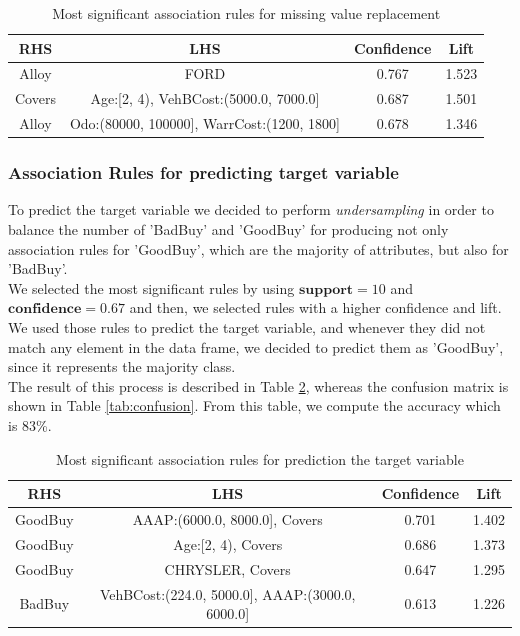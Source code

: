 \documentclass{article}
\begin{document}
	
	\begin{table}[H]
		\centering
		\begin{tabular}{|cc|cc|}
			\hline
			\textbf{RHS} & \textbf{LHS} & \textbf{Confidence} & \textbf{Lift} \\
			\hline
			\rowcolor{Gray}
			Alloy & FORD  & 0.767 & 1.523\\
			Covers & Age:[2, 4), VehBCost:(5000.0, 7000.0]  & 0.687 & 1.501 \\
			\rowcolor{Gray}
			Alloy &  Odo:(80000, 100000], WarrCost:(1200, 1800] &  0.678 & 1.346 \\
			\hline
		\end{tabular}
		\caption{Most significant association rules for missing value replacement}
		\label{tab:missingvalrules}
	\end{table}
	
	
	\subsubsection{Association Rules for predicting target variable}
	To predict the target variable we decided to perform \emph{undersampling} in order to balance the number of 'BadBuy' and 'GoodBuy' for producing not only association rules for 'GoodBuy', which are the majority of attributes, but also for 'BadBuy'.\\
	We selected the most significant rules by using $\mathbf{support}=10$ and $\mathbf{confidence} = 0.67$ and then, we selected rules with a higher confidence and lift.\\
	We used those rules to predict the target variable, and whenever they did not match any element in the data frame, we decided to predict them as 'GoodBuy', since it represents the majority class. \\
	The result of this process is described in Table \ref{tab:predict}, whereas the confusion matrix is shown in Table \ref{tab:confusion}.
	From this table, we compute the accuracy which is 83\%.
	
	\begin{table}[H]
		\centering
		\begin{tabular}{|cc|cc|}
			\hline
			\textbf{RHS} & \textbf{LHS} & \textbf{Confidence} & \textbf{Lift} \\
			\hline
			\rowcolor{Gray}
			GoodBuy & AAAP:(6000.0, 8000.0], Covers  & 0.701 & 1.402 \\
			GoodBuy & Age:[2, 4), Covers & 0.686 & 1.373 \\
			\rowcolor{Gray}
			GoodBuy &  CHRYSLER, Covers &  0.647 & 1.295 \\
			BadBuy &  VehBCost:(224.0, 5000.0], AAAP:(3000.0, 6000.0] & 0.613 & 1.226\\
			\hline
		\end{tabular}
		\caption{Most significant association rules for prediction the target variable}
		\label{tab:predict}
	\end{table}
	
\end{document}
